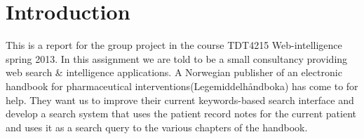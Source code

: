 \section{Introduction}
\label{sec:introduction}

This is a report for the group project in the course TDT4215 Web-intelligence spring 2013. In this assignment we are told to be a small consultancy providing web search & intelligence applications. A Norwegian publisher of an electronic handbook for pharmaceutical interventions(Legemiddelhåndboka) has come to for help. They want us to improve their current keywords-based search interface and develop a search system that uses the patient record notes for the current patient and uses it as a search query to the various chapters of the handbook.
